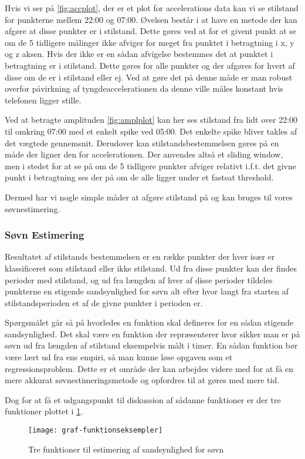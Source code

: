 Hvis vi ser på \cref{fig:accplot}, der er et plot for accelerations data kan vi se stilstand for punkterne mellem 22:00 og 07:00.
Øvelsen består i at have en metode der kan afgøre at disse punkter er i stilstand.
Dette gøres ved at for et givent punkt at se om de 5 tidligere målinger ikke afviger for meget fra punktet i betragtning i x, y og z aksen.
Hvis der ikke er en sådan afvigelse bestemmes det at punktet i betragtning er i stilstand.
Dette gøres for alle punkter og der afgøres for hvert af disse om de er i stilstand eller ej.
Ved at gøre det på denne måde er man robust overfor påvirkning af tyngdeaccelerationen da denne ville måles konstant hvis telefonen ligger stille.

Ved at betragte amplituden \cref{fig:amplplot} kan her ses stilstand fra lidt over 22:00 til omkring 07:00 med et enkelt spike ved 05:00.
Det enkelte spike bliver takles af det vægtede gennemsnit.
Derudover kan stilstandsbestemmelsen gøres på en måde der ligner den for accelerationen.
Der anvendes altså et sliding window, men i stedet for at se på om de 5 tidligere punkter afviger relativt i.f.t. det givne punkt i betragtning ses der på om de alle ligger under et fastsat threshold.

Dermed har vi nogle simple måder at afgøre stilstand på og kan bruges til vores søvnestimering.
\subsubsection{Søvn Estimering}
Resultatet af stilstands bestemmelsen er en række punkter der hver især er klassificeret som stilstand eller ikke stilstand.
Ud fra disse punkter kan der findes perioder med stilstand, og ud fra længden af hver af disse perioder tildeles punkterne en stigende sandsynlighed for søvn alt efter hvor langt fra starten af stilstandsperioden et af de givne punkter i perioden er.


Spørgsmålet går så på hvorledes en funktion skal defineres for en sådan stigende sandsynlighed.
Det skal være en funktion der repræsenterer hvor sikker man er på søvn ud fra længden af stilstand eksempelvis målt i timer.
En sådan funktion bør være lært ud fra ens empiri, så man kunne løse opgaven som et regressionsproblem.
Dette er et område der kan arbejdes videre med for at få en mere akkurat søvnestimeringsmetode og opfordres til at gøres med mere tid.

Dog for at få et udgangspunkt til diskussion af sådanne funktioner er der tre funktioner plottet i \cref{fig:trefunc}.
\begin{figure}[h]
	\centering
	\texttt{[image: graf-funktionseksempler]}
	\caption{Tre funktioner til estimering af sandsynlighed for søvn}\label{fig:trefunc}
\end{figure}

